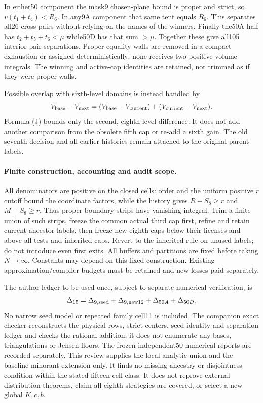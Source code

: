 In either50 component the mask9 chosen-plane bound is proper and
strict, so $v(t_1+t_4)<R_6$. In any9A component that same tent equals
$R_6$. This separates all26 cross pairs without relying on the names
of the winners. Finally the50A half has $t_2+t_5+t_6<\mu$ while50D
has that sum $>\mu$. Together these give all105 interior pair
separations. Proper equality walls are removed in a compact exhaustion
or assigned deterministically; none receives two positive-volume
integrals. The winning and active-cap identities are retained, not
trimmed as if they were proper walls.

Possible overlap with sixth-level domains is instead handled by
\[
 V_{\rm base}-V_{\rm next}
 =(V_{\rm base}-V_{\rm current})
  +(V_{\rm current}-V_{\rm next}).
\]
Formula (J) bounds only the second, eighth-level difference. It does
not add another comparison from the obsolete fifth cap or re-add a
sixth gain. The old seventh decision and all earlier histories remain
attached to the original parent labels.

\paragraph{Finite construction, accounting and audit scope.}
All denominators are positive on the closed cells: order and the
uniform positive $r$ cutoff bound the coordinate factors, while
the history gives $R-S_8\ge r$ and $M-S_8\ge r$. Thus proper boundary
strips have vanishing integral. Trim a finite union of such strips,
freeze the common actual third cap first, refine and retain current
ancestor labels, then freeze new eighth caps below their licenses
and above all tests and inherited caps. Revert to the inherited rule
on unused labels; do not introduce even first exits. All buffers and
partitions are fixed before taking $N\to\infty$. Constants may depend
on this fixed construction. Existing approximation/compiler budgets
must be retained and new losses paid separately.

The author ledger to be used once, subject to separate numerical
verification, is
\[
 \Delta_{15}=\Delta_{9,\rm seed}+\Delta_{9,\rm new12}
                 +\Delta_{50A}+\Delta_{50D}.
\]
No narrow seed model or repeated family cell11 is included. The
companion exact checker reconstructs the physical rows, strict centers,
seed identity and separation ledger and checks the rational addition;
it does not enumerate any bases, triangulations or Jensen floors.
The frozen independent50 numerical reports are recorded separately.
This review supplies the local analytic union and the baseline-minorant
extension only. It finds no missing ancestry or disjointness condition
within the stated fifteen-cell class. It does not reprove external
distribution theorems, claim all eighth strategies are covered, or
select a new global $K,c,b$.

